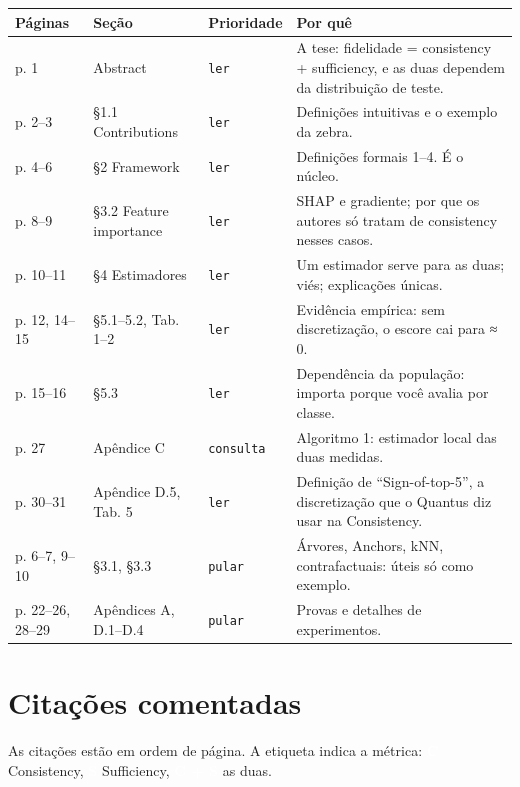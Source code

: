 \documentclass[11pt,a4paper]{article}
\newcommand{\metrictag}[2]{{\setlength{\fboxsep}{1.5pt}%
  \ifstrequal{#1}{c}{\colorbox{cC}{\textcolor{white}{\scriptsize\textbf{#2}}}}{%
  \ifstrequal{#1}{s}{\colorbox{cS}{\textcolor{white}{\scriptsize\textbf{#2}}}}{%
  \colorbox{black!60}{\textcolor{white}{\scriptsize\textbf{#2}}}}}}}
\newcommand{\readtag}[1]{\texttt{\small #1}}
\begin{document}
\begin{center}\small
\begin{tabularx}{\linewidth}{XXXX}
\toprule
\textbf{Páginas} & \textbf{Seção} & \textbf{Prioridade} & \textbf{Por quê} \\
\midrule
p. 1 & Abstract & \readtag{ler} & A tese: fidelidade = consistency + sufficiency, e as duas dependem da distribuição de teste. \\
p. 2–3 & §1.1 Contributions & \readtag{ler} & Definições intuitivas e o exemplo da zebra. \\
p. 4–6 & §2 Framework & \readtag{ler} & Definições formais 1–4. É o núcleo. \\
p. 8–9 & §3.2 Feature importance & \readtag{ler} & SHAP e gradiente; por que os autores só tratam de consistency nesses casos. \\
p. 10–11 & §4 Estimadores & \readtag{ler} & Um estimador serve para as duas; viés; explicações únicas. \\
p. 12, 14–15 & §5.1–5.2, Tab. 1–2 & \readtag{ler} & Evidência empírica: sem discretização, o escore cai para ≈ 0. \\
p. 15–16 & §5.3 & \readtag{ler} & Dependência da população: importa porque você avalia por classe. \\
p. 27 & Apêndice C & \readtag{consulta} & Algoritmo 1: estimador local das duas medidas. \\
p. 30–31 & Apêndice D.5, Tab. 5 & \readtag{ler} & Definição de “Sign-of-top-5”, a discretização que o Quantus diz usar na Consistency. \\
p. 6–7, 9–10 & §3.1, §3.3 & \readtag{pular} & Árvores, Anchors, kNN, contrafactuais: úteis só como exemplo. \\
p. 22–26, 28–29 & Apêndices A, D.1–D.4 & \readtag{pular} & Provas e detalhes de experimentos. \\
\bottomrule
\end{tabularx}
\end{center}

\section{Citações comentadas}
As citações estão em ordem de página. A etiqueta indica a métrica: \metrictag{c}{C} Consistency, \metrictag{s}{S} Sufficiency, \metrictag{cs}{C + S} as duas.
\end{document}
